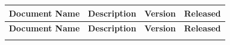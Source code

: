 \begin{longtable}{|l|l|l|l|}
\hline
\begin{minipage}{0.39\linewidth}\raggedright\vspace{.75ex}\textbf{Document Name}\vspace{.75ex}\end{minipage} & \begin{minipage}{0.19\linewidth}\raggedright\vspace{.75ex}\textbf{Description}\vspace{.75ex}\end{minipage} & \begin{minipage}{0.19\linewidth}\raggedright\vspace{.75ex}\textbf{Version}\vspace{.75ex}\end{minipage} & \begin{minipage}{0.12\linewidth}\raggedright\vspace{.75ex}\textbf{Released}\vspace{.75ex}\end{minipage}\\
\hline\hline
\endfirsthead
\hline
\begin{minipage}{0.39\linewidth}\raggedright\vspace{.75ex}\textbf{Document Name}\vspace{.75ex}\end{minipage} & \begin{minipage}{0.19\linewidth}\raggedright\vspace{.75ex}\textbf{Description}\vspace{.75ex}\end{minipage} & \begin{minipage}{0.19\linewidth}\raggedright\vspace{.75ex}\textbf{Version}\vspace{.75ex}\end{minipage} & \begin{minipage}{0.12\linewidth}\raggedright\vspace{.75ex}\textbf{Released}\vspace{.75ex}\end{minipage}\\
\hline\hline
\endhead
\hline
\endfoot
\hline
\endlastfoot

\end{longtable}
